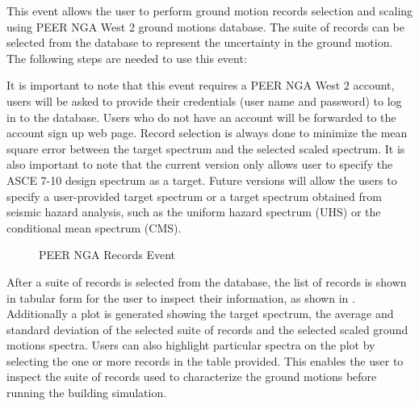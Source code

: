 
This event allows the user to perform ground motion records selection and scaling using PEER NGA West 2 ground motions database. The suite of records can be selected from the database to represent the uncertainty in the ground motion. The following steps are needed to use this event:




It is important to note that this event requires a PEER NGA West 2 account, users will be asked to provide their credentials (user name and password) to log in to the database. Users who do not have an account will be forwarded to the account sign up web page. Record selection is always done to minimize the mean square error between the target spectrum and the selected scaled spectrum. It is also important to note that the current version only allows user to specify the ASCE 7-10 design spectrum as a target. Future versions will allow the users to specify a user-provided target spectrum or a target spectrum obtained from seismic hazard analysis, such as the uniform hazard spectrum (UHS) or the conditional mean spectrum (CMS).


\begin{figure}[!htbp]
  \caption{PEER NGA Records Event}
  \label{fig:PeerNgaRecordsWidget}
\end{figure}


After a suite of records is selected from the database, the list of records is shown in tabular form for the user to inspect their information, as shown in . Additionally a plot is generated showing the target spectrum, the average and standard deviation of the selected suite of records and the selected scaled ground motions spectra. Users can also highlight particular spectra on the plot by selecting the one or more records in the table provided. This enables the user to inspect the suite of records used to characterize the ground motions before running the building simulation.